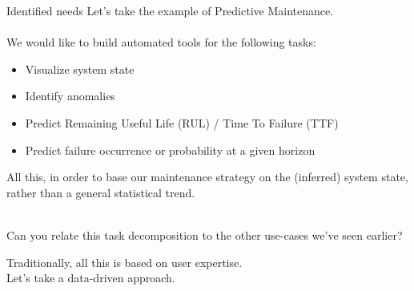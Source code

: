 \documentclass{beamer}
\begin{document}
\begin{frame}{Identified needs}
Let's take the example of Predictive Maintenance.\\
~\\
We would like to build automated tools for the following tasks:
\begin{itemize}
\item Visualize system state
\item Identify anomalies
\item Predict Remaining Useful Life (RUL) / Time To Failure (TTF)
\item Predict failure occurrence or probability at a given horizon
\end{itemize}
All this, in order to base our maintenance strategy on the (inferred) system state, rather than a general statistical trend.\\
~\\
\begin{block}{}
Can you relate this task decomposition to the other use-cases we've seen earlier?
\end{block}
Traditionally, all this is based on user expertise.\\
Let's take a data-driven approach.
\end{frame}
\end{document}

